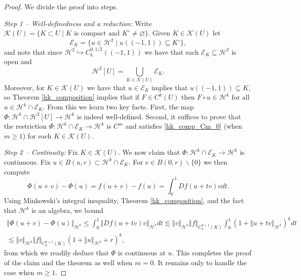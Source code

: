 \documentclass[10pt,a4paper]{amsart}
\theoremstyle{plain}
\theoremstyle{definition}
\theoremstyle{remark}
\def\h{\mathcal{H}}
\def\ls{\lesssim}
\def\st{\;\vert\;}
\providecommand{\norm}[1]{\left\Vert#1\right\Vert}
\begin{document}
\begin{proof}
We divide the proof into steps.

\emph{Step 1 -- Well-definedness and a reduction:}   Write $\mathcal{K}(U) = \{ K \subset U \st K \text{ is compact and } K^\circ \neq \varnothing\}$.  Given $K \in \mathcal{K}(U)$ let 
\begin{equation}
 \mathcal{E}_K = \{u \in \h^2 \st \overline{u((-1,1))} \subseteq K^\circ \},
\end{equation}
and note that since $\h^2 \hookrightarrow C^{0,1/2}_b((-1,1))$ we have that each   $\mathcal{E}_K \subseteq \h^2$ is open  and 
\begin{equation}
 \h^2[U] = \bigcup_{K \in \mathcal{K}(U)} \mathcal{E}_K.
\end{equation}
Moreover, for $K \in \mathcal{K}(U)$ we have that $u \in \mathcal{E}_K$ implies that $\overline{u((-1,1))} \subseteq K$, so Theorem \ref{hk_composition} implies that if $F\in C^k(U)$ then  $F\circ u \in \h^k$ for all $u \in \h^k \cap \mathcal{E}_K$.  From this we learn two key facts.  First, the map $\Phi : \h^k \cap \h^2[U] \to \h^k $ is indeed well-defined.  Second, it suffices to prove that the restriction $\Phi : \h^k \cap \mathcal{E}_K \to \h^k$ is $C^m$ and satisfies \eqref{hk_comp_Cm_0} (when $m \ge 1$) for each $K \in \mathcal{K}(U)$.


\emph{Step 2 -- Continuity:}  Fix $K \in \mathcal{K}(U)$.   We now claim that $\Phi : \h^k \cap \mathcal{E}_K \to \h^k$ is continuous.  Fix $u \in B(u,r) \subset \h^k \cap \mathcal{E}_K$.   For $v \in B(0,r) \backslash \{0\}$ we then compute 
\begin{equation}
\Phi(u+v) - \Phi(u) = f(u+v) - f(u) = \int_0^1 Df(u+tv)v dt. 
\end{equation}
Using Minkowski's integral inequality,  Theorem \ref{hk_composition},  and the fact that $\h^k$ is an algebra, we bound
\begin{multline}
 \norm{\Phi(u+v) - \Phi(u)}_{\h^k} \le \int_0^1 \norm{Df(u+tv) v}_{\h^k} dt \ls \norm{v}_{\h^k} \norm{f}_{C^{k+1}_b(K)} \int_0^1 (1+ \norm{u+tv}_{\h^k})^k dt \\
 \ls  \norm{v}_{\h^k} \norm{f}_{C^{k+1}_b(K)} (1+ \norm{u}_{\h^k} + r)^k,
\end{multline}
from which we readily deduce that $\Phi$ is continuous at $u$.   This completes the proof of the claim and the theorem as well when $m=0$.  It remains only to handle the case when $m \ge 1$.





\end{proof}
\end{document}
